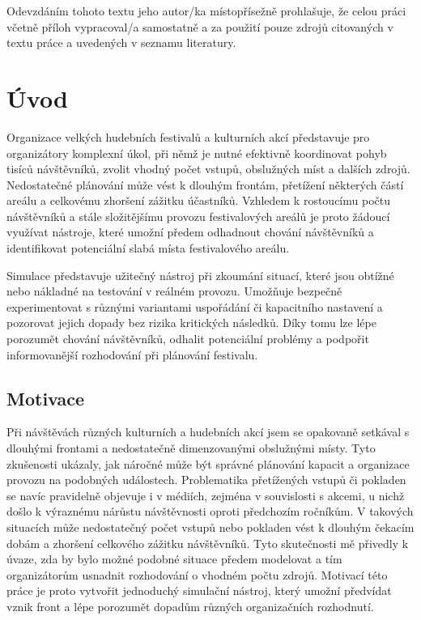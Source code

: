 \documentclass[12pt,a4paper]{article}
\begin{document}
Odevzdáním tohoto textu jeho autor/ka místopřísežně prohlašuje, že celou práci
včetně příloh vypracoval/a samostatně a za použití pouze zdrojů citovaných v textu
práce a uvedených v seznamu literatury.

\clearpage

\tableofcontents

\section{Úvod}
Organizace velkých hudebních festivalů a kulturních akcí představuje pro organizátory komplexní úkol, při němž je nutné efektivně koordinovat pohyb tisíců návštěvníků, zvolit vhodný počet vstupů, obslužných míst a dalších zdrojů. Nedostatečné plánování může vést k dlouhým frontám, přetížení některých částí areálu a celkovému zhoršení zážitku účastníků. Vzhledem k rostoucímu počtu návštěvníků a stále složitějšímu provozu festivalových areálů je proto žádoucí využívat nástroje, které umožní předem odhadnout chování návštěvníků a identifikovat potenciální slabá místa festivalového areálu.

Simulace představuje užitečný nástroj při zkoumání situací, které jsou obtížné nebo nákladné na testování v reálném provozu. Umožňuje bezpečně experimentovat s různými variantami uspořádání či kapacitního nastavení a pozorovat jejich dopady bez rizika kritických následků. Díky tomu lze lépe porozumět chování návštěvníků, odhalit potenciální problémy a podpořit informovanější rozhodování při plánování festivalu.

 
\subsection{Motivace}
Při návštěvách různých kulturních a hudebních akcí jsem se opakovaně setkával s dlouhými frontami a nedostatečně dimenzovanými obslužnými místy. Tyto zkušenosti ukázaly, jak náročné může být správné plánování kapacit a organizace provozu na podobných událostech. Problematika přetížených vstupů či pokladen se navíc pravidelně objevuje i v médiích, zejména v souvislosti s akcemi, u nichž došlo k výraznému nárůstu návštěvnosti oproti předchozím ročníkům. V takových situacích může nedostatečný počet vstupů nebo pokladen vést k dlouhým čekacím dobám a zhoršení celkového zážitku návštěvníků. Tyto skutečnosti mě přivedly k úvaze, zda by bylo možné podobné situace předem modelovat a tím organizátorům usnadnit rozhodování o vhodném počtu zdrojů. Motivací této práce je proto vytvořit jednoduchý simulační nástroj, který umožní předvídat vznik front a lépe porozumět dopadům různých organizačních rozhodnutí.
\end{document}
